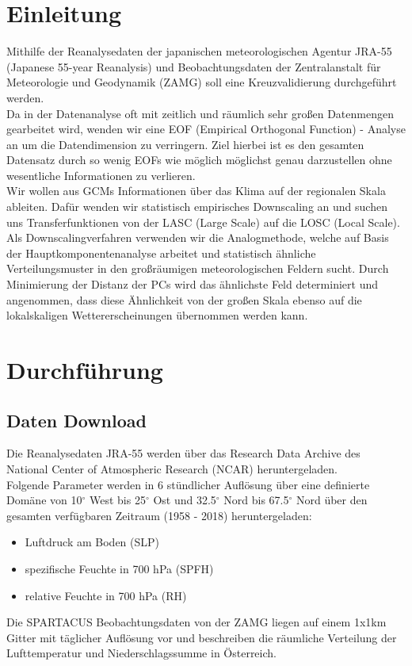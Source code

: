 \documentclass[12pt]{article}
\begin{document}
\section{Einleitung}
Mithilfe der Reanalysedaten der japanischen meteorologischen Agentur JRA-55 (Japanese 55-year Reanalysis) und Beobachtungsdaten der Zentralanstalt für Meteorologie und Geodynamik (ZAMG) soll eine Kreuzvalidierung durchgeführt werden.\\
Da in der Datenanalyse oft mit zeitlich und räumlich sehr großen Datenmengen gearbeitet wird, wenden wir eine EOF (Empirical Orthogonal Function) - Analyse an um die Datendimension zu verringern. Ziel hierbei ist es den gesamten Datensatz durch so wenig EOFs wie möglich möglichst genau darzustellen ohne wesentliche Informationen zu verlieren.\\
Wir wollen aus GCMs Informationen über das Klima auf der regionalen Skala ableiten. Dafür wenden wir statistisch empirisches Downscaling an und suchen uns Transferfunktionen von der LASC (Large Scale) auf die LOSC (Local Scale).\\
Als Downscalingverfahren verwenden wir die Analogmethode, welche auf Basis der Hauptkomponentenanalyse arbeitet und statistisch ähnliche Verteilungsmuster in den großräumigen meteorologischen Feldern sucht. Durch Minimierung der Distanz der PCs wird das ähnlichste Feld determiniert und angenommen, dass diese Ähnlichkeit von der großen Skala ebenso auf die lokalskaligen Wettererscheinungen übernommen werden kann.\\
\section{Durchführung}
\subsection{Daten Download}
Die Reanalysedaten JRA-55 werden über das Research Data Archive des National Center of Atmospheric Research (NCAR) heruntergeladen.\\
Folgende Parameter werden in 6 stündlicher Auflösung über eine definierte Domäne von 10$ ^\circ $ West bis 25$ ^\circ $ Ost und 32.5$ ^\circ $ Nord bis 67.5$ ^\circ $ Nord über den gesamten verfügbaren Zeitraum (1958 - 2018) heruntergeladen:

\begin{itemize} 
	\item Luftdruck am Boden (SLP)
	\item spezifische Feuchte in 700 hPa (SPFH)
	\item relative Feuchte in 700 hPa (RH)
\end{itemize}
\vspace{3mm}
Die SPARTACUS Beobachtungsdaten von der ZAMG liegen auf einem 1x1km Gitter mit täglicher Auflösung vor und beschreiben die räumliche Verteilung der Lufttemperatur und Niederschlagssumme in Österreich. 
\end{document}
